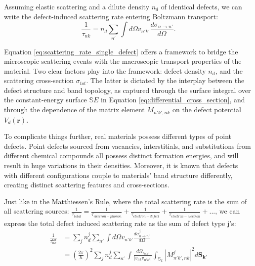 Assuming elastic scattering and a dilute density $n_d$ of identical defects, we can write the defect-induced scattering rate entering Boltzmann transport: 
\begin{equation}
	\label{eq:scattering_rate_single_defect}
	\frac{1}{\tau_{nk}} = n_d \sum_{n'}\int d\Omega v_{n'k'} \frac{d\sigma_{n\rightarrow n'}}{d\Omega}. 
\end{equation}

Equation \ref{eq:scattering_rate_single_defect} offers a framework to bridge the microscopic scattering events with the macroscopic transport properties of the material. Two clear factors play into the framework: defect density $n_d$, and the scattering cross-section $\sigma_{tot}$. The latter is dictated by the interplay between the defect structure and band topology, as captured through the surface integral over the constant-energy surface $\mathbb{S}E$ in Equation \ref{eq:differential_cross_section}, and through the dependence of the matrix element $M_{n'k',nk}$ on the defect potential $V_d(\mathbf{r})$.

To complicate things further, real materials possess different types of point defects\cite{stuartScanningTunnellingMicroscopy2021}\cite{bertoldoQuantumPointDefects2022}. Point defects sourced from vacancies, interstitials, and substitutions from different chemical compounds all possess distinct formation energies\cite{bertoldoQuantumPointDefects2022}\cite{lopesDefectFormationEnergy2023}, and will result in huge variations in their densities. Moreover, it is known that defects with different configurations couple to materials' band structure differently, creating distinct scattering features and cross-sections\cite{butlerQuasiparticleInterferenceZrSiS2017}\cite{chiSignInversionSuperconducting2014}\cite{derryQuasiparticleInterferenceMagnetic2015a}. 

Just like in the Matthiessen’s Rule, where the total scattering rate is the sum of all scattering sources: $\frac{1}{\tau_{total}} = \frac{1}{\tau_{electron-phonon}} + \frac{1}{\tau_{electron-defect}} + \frac{1}{\tau_{electron-electron}}+...$, we can express the total defect induced scattering rate as the sum of defect type j's: 
\begin{align}
	\label{eq:scattering_rate_multi_defect}
	\frac{1}{\tau_{nk}^{tot}} &= \sum_j n_d^j \sum_{n'}\int d\Omega v_{n'k'} \frac{d\sigma^j_{n\rightarrow n'}}{d\Omega}\\
	&= (\frac{2\pi}{\hslash})^2 \sum_j n_d^j \sum_{n'} \int \frac{d\Omega_{v_{n'k'}}}{|v_{nk}v_{n'k'}|}\int_{\mathbb{S_E}}|M_{n'k',nk}^j|^2 d\mathbf{S_{k'}}
\end{align}

